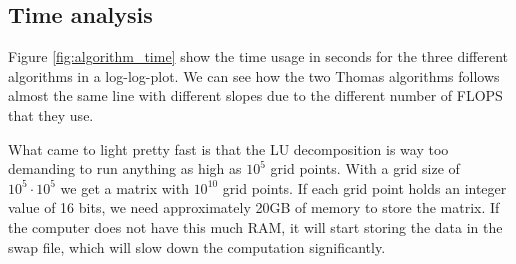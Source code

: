 \documentclass{emulateapj}
\begin{document}
\subsection{Time analysis}

    Figure \ref{fig:algorithm_time} show the time usage in seconds for the three different algorithms in a log-log-plot. We can see how the two Thomas algorithms follows almost the same line with different slopes due to the different number of FLOPS that they use.
    
    What came to light pretty fast is that the LU decomposition is way too demanding to run anything as high as $10^5$ grid points. With a grid size of $10^5 \cdot 10^5$ we get a matrix with $10^{10}$ grid points. If each grid point holds an integer value of 16 bits, we need approximately 20GB of memory to store the matrix. If the computer does not have this much RAM, it will start storing the data in the swap file, which will slow down the computation significantly.
    
%
    
\end{document}
